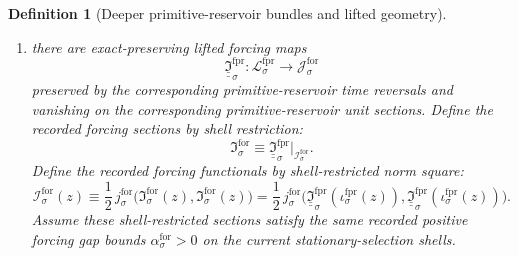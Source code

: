 \documentclass[11pt]{article}
\newcommand{\ForSpace}[1]{\mathcal I_{#1}^{\mathrm{for}}}
\newcommand{\ForTarget}[1]{\mathcal J_{#1}^{\mathrm{for}}}
\newcommand{\ForTargetMetric}[1]{j_{#1}^{\mathrm{for}}}
\newcommand{\ForGap}[1]{\alpha_{#1}^{\mathrm{for}}}
\newcommand{\ForSection}[1]{\mathfrak I_{#1}^{\mathrm{for}}}
\newcommand{\ForFunctional}[1]{\mathscr I_{#1}^{\mathrm{for}}}
\newcommand{\ForPrimSpace}[1]{\mathcal L_{#1}^{\mathrm{fpr}}}
\newcommand{\ForPrimMetric}[1]{L_{#1}^{\mathrm{fpr}}}
\newcommand{\ForPrimTargetMetric}[1]{y_{#1}^{\mathrm{fpr}}}
\newcommand{\ForPrimGap}[1]{\beta_{#1}^{\mathrm{fpr}}}
\newcommand{\ForPrimSection}[1]{\mathfrak L_{#1}^{\mathrm{fpr}}}
\newcommand{\ForPrimFunctional}[1]{\mathscr L_{#1}^{\mathrm{fpr}}}
\newcommand{\ForPrimInc}[1]{\iota_{#1}^{\mathrm{fpr}}}
\newcommand{\ForPrimLiftedForcing}[1]{\underline{\underline{\mathfrak I}}_{#1}^{\mathrm{fpr}}}
\newtheorem{definition}{Definition}
\begin{document}
\begin{definition}[Deeper primitive-reservoir bundles and lifted geometry]
\begin{enumerate}
\begin{equation}
    \label{eq:primitive_reservoir_functional}
    \end{equation}
    Define the recorded forcing bundles as the exact zero shells
    \begin{equation}
    \ForSpace{\sigma}\equiv \left(\ForPrimSection{\sigma}\right)^{-1}(0),
    \qquad
    \ForPrimInc{\sigma}:\ForSpace{\sigma}\hookrightarrow \ForPrimSpace{\sigma}.
    \label{eq:forcing_shell_from_reservoir}
    \end{equation}
    Assume these shells are closed embedded \(C^2\) submanifolds, invariant under the corresponding primitive-reservoir time reversals, containing the images of the corresponding primitive-reservoir unit sections, equal to the exact set of global minima of \(\ForPrimFunctional{\sigma}\), and satisfying the positive normal primitive-reservoir gap bound
    \begin{equation}
    \ForPrimTargetMetric{\sigma}\!\left(
    D\ForPrimSection{\sigma}(w)\xi,
    D\ForPrimSection{\sigma}(w)\xi
    \right)
    \ge
    \ForPrimGap{\sigma}\,
    \ForPrimMetric{\sigma}(\xi,\xi),
    \qquad
    \ForPrimGap{\sigma}>0,
    \label{eq:primitive_reservoir_gap}
    \end{equation}
    for all \(w\in\ForSpace{\sigma}\) and all \(\xi\) orthogonal, with respect to \(\ForPrimMetric{\sigma}\), to \(T_w\ForSpace{\sigma}\).
    \item there are exact-preserving lifted forcing maps
    \[
    \ForPrimLiftedForcing{\sigma}:\ForPrimSpace{\sigma}\to\ForTarget{\sigma}
    \]
    preserved by the corresponding primitive-reservoir time reversals and vanishing on the corresponding primitive-reservoir unit sections. Define the recorded forcing sections by shell restriction:
    \begin{equation}
    \ForSection{\sigma}\equiv \ForPrimLiftedForcing{\sigma}|_{\ForSpace{\sigma}}.
    \label{eq:forcing_section_from_reservoir}
    \end{equation}
    Define the recorded forcing functionals by shell-restricted norm square:
    \begin{equation}
    \ForFunctional{\sigma}(z)
    \equiv
    \frac12\,\ForTargetMetric{\sigma}\bigl(\ForSection{\sigma}(z),\ForSection{\sigma}(z)\bigr)
    =
    \frac12\,\ForTargetMetric{\sigma}\bigl(\ForPrimLiftedForcing{\sigma}(\ForPrimInc{\sigma}(z)),\ForPrimLiftedForcing{\sigma}(\ForPrimInc{\sigma}(z))\bigr).
    \label{eq:forcing_functional_from_reservoir}
    \end{equation}
    Assume these shell-restricted sections satisfy the same recorded positive forcing gap bounds \(\ForGap{\sigma}>0\) on the current stationary-selection shells.

\end{enumerate}
\end{definition}
\end{document}
